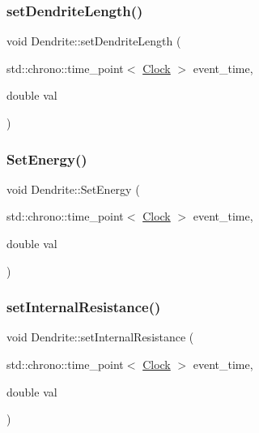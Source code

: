 \mbox{\label{classDendrite_a9bc84d369ac487b095ed1641f89469d2}} 
\subsubsection{\texorpdfstring{set\+Dendrite\+Length()}{setDendriteLength()}}
{\footnotesize\ttfamily void Dendrite\+::set\+Dendrite\+Length (\begin{DoxyParamCaption}\item[{std\+::chrono\+::time\+\_\+point$<$ \mbox{\hyperlink{universe_8h_a0ef8d951d1ca5ab3cfaf7ab4c7a6fd80}{Clock}} $>$}]{event\+\_\+time,  }\item[{double}]{val }\end{DoxyParamCaption})\hspace{0.3cm}{\ttfamily [inline]}}

\mbox{\label{classDendrite_ad341dcd42c9d5d486be1e8268d8bca27}} 
\subsubsection{\texorpdfstring{Set\+Energy()}{SetEnergy()}}
{\footnotesize\ttfamily void Dendrite\+::\+Set\+Energy (\begin{DoxyParamCaption}\item[{std\+::chrono\+::time\+\_\+point$<$ \mbox{\hyperlink{universe_8h_a0ef8d951d1ca5ab3cfaf7ab4c7a6fd80}{Clock}} $>$}]{event\+\_\+time,  }\item[{double}]{val }\end{DoxyParamCaption})\hspace{0.3cm}{\ttfamily [inline]}}

\mbox{\label{classDendrite_ac79018e356cec31be05518b85c73a54d}} 
\subsubsection{\texorpdfstring{set\+Internal\+Resistance()}{setInternalResistance()}}
{\footnotesize\ttfamily void Dendrite\+::set\+Internal\+Resistance (\begin{DoxyParamCaption}\item[{std\+::chrono\+::time\+\_\+point$<$ \mbox{\hyperlink{universe_8h_a0ef8d951d1ca5ab3cfaf7ab4c7a6fd80}{Clock}} $>$}]{event\+\_\+time,  }\item[{double}]{val }\end{DoxyParamCaption})\hspace{0.3cm}{\ttfamily [inline]}}

